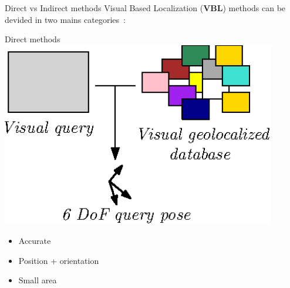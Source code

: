 \begin{frame}{Direct vs Indirect methods}
	Visual Based Localization (\textbf{VBL}) methods can be devided in two mains categories~\cite{Piasco2017}:
	\vfill
	\begin{minipage}[t]{0.48\linewidth}
		\begin{block}{Direct methods}
			\includegraphics[width=0.9\textwidth]{vect/direct.eps}
			\begin{itemize}
				\item Accurate
				\item Position + orientation
				\item Small area
			\end{itemize}
		\end{block}
	\end{minipage}
	\hfill
\end{frame}

